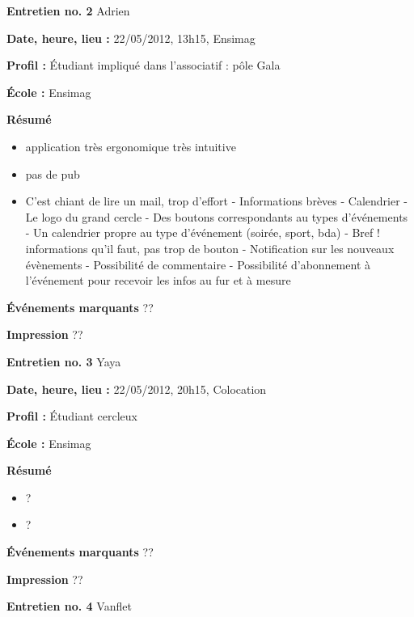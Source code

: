 \documentclass[a4paper, 11px]{article}
\begin{document}


\vspace{.3cm}

 \textbf {\large Entretien no. 2}
Adrien

\textbf{Date, heure, lieu : }
22/05/2012, 13h15, Ensimag

\textbf{Profil : }
Étudiant impliqué dans l'associatif : pôle Gala

\textbf{École : }
Ensimag

\textbf{Résumé}
	\begin{itemize}
		\item application très ergonomique très intuitive
		\item pas de pub
		\item C’est chiant de lire un mail, trop d'effort
	- Informations brèves
	- Calendrier
	- Le logo du grand cercle
	- Des boutons correspondants au types d’événements
	- Un calendrier propre au type d’événement (soirée, sport, bda)
	- Bref ! informations qu’il faut, pas trop de bouton
	- Notification sur les nouveaux évènements
	- Possibilité de commentaire
	- Possibilité d’abonnement à l’événement pour recevoir les infos au fur et à mesure
	\end{itemize}

\textbf{Événements marquants}
??

\textbf{Impression}
??



\vspace{.3cm}

 \textbf {\large Entretien no. 3}
Yaya

\textbf{Date, heure, lieu : }
22/05/2012, 20h15, Colocation

\textbf{Profil : }
Étudiant cercleux

\textbf{École : }
Ensimag

\textbf{Résumé}
	\begin{itemize}
		\item ?
		\item ?
	\end{itemize}

\textbf{Événements marquants}
??

\textbf{Impression}
??



\vspace{.3cm}

 \textbf {\large Entretien no. 4}
Vanflet
\end{document}
